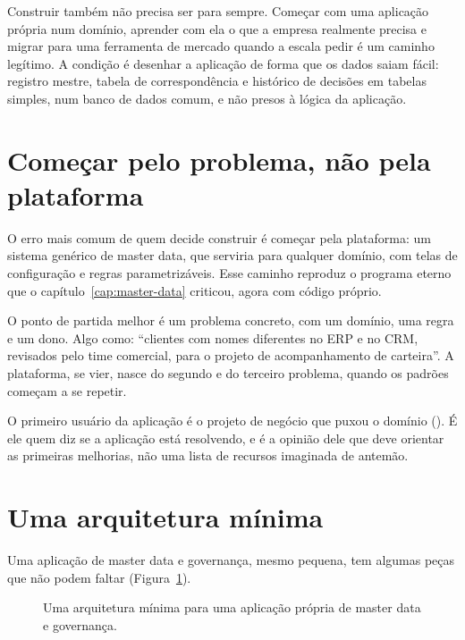 Construir também não precisa ser para sempre. Começar com uma aplicação própria num
domínio, aprender com ela o que a empresa realmente precisa e migrar para uma ferramenta de
mercado quando a escala pedir é um caminho legítimo. A condição é desenhar a aplicação de
forma que os dados saiam fácil: registro mestre, tabela de correspondência e histórico de
decisões em tabelas simples, num banco de dados comum, e não presos à lógica da aplicação.

\section{Começar pelo problema, não pela plataforma}
\label{sec:comecar-pequeno}

O erro mais comum de quem decide construir é começar pela plataforma: um sistema genérico de
master data, que serviria para qualquer domínio, com telas de configuração e regras
parametrizáveis. Esse caminho reproduz o programa eterno que o capítulo~\ref{cap:master-data}
criticou, agora com código próprio.

O ponto de partida melhor é um problema concreto, com um domínio, uma regra e um dono.
Algo como: \enquote{clientes com nomes diferentes no ERP e no CRM, revisados pelo time
comercial, para o projeto de acompanhamento de carteira}. A plataforma, se vier, nasce do
segundo e do terceiro problema, quando os padrões começam a se repetir.

O primeiro usuário da aplicação é o projeto de negócio que puxou o domínio
(). É ele quem diz se a aplicação está resolvendo, e é a
opinião dele que deve orientar as primeiras melhorias, não uma lista de recursos imaginada
de antemão.

\section{Uma arquitetura mínima}
\label{sec:arquitetura-minima}

Uma aplicação de master data e governança, mesmo pequena, tem algumas peças que não podem
faltar (Figura~\ref{fig:aplicacao-propria}).

\begin{figure}[htbp]
  \centering
  
  \caption{Uma arquitetura mínima para uma aplicação própria de master data e
    governança.}
  \label{fig:aplicacao-propria}
\end{figure}

